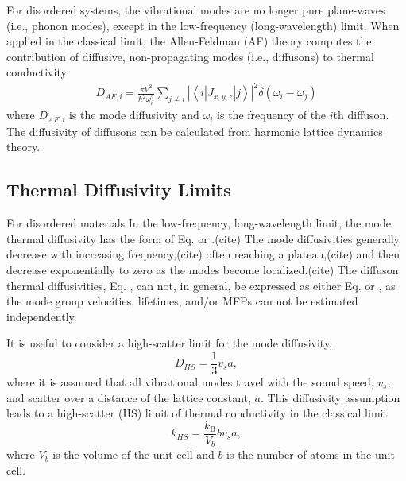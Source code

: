 \documentclass[aps,prb,twocolumn,superscriptaddress,footinbib,amsmath,amssymb,floatfix]{revtex4}
\begin{document}
For disordered systems, the vibrational modes are no 
longer pure plane-waves (i.e., phonon modes), except in the low-frequency 
(long-wavelength) limit. When applied in the classical limit, 
the Allen-Feldman (AF) theory computes 
the contribution of diffusive, non-propagating modes (i.e., diffusons) 
to thermal conductivity\cite{allen_thermal_1993} 
\begin{equation}\label{EQ:DAF}
\begin{split}
D_{AF,i} = \frac{\pi V^2}{\hbar^2\omega^2_i}\sum_{j\neq i}
|\left< i | J_{x,y,z} | j \right>|^2 \delta(\omega_i - \omega_j)
\end{split}
\end{equation}
where $D_{AF,i}$ is the mode diffusivity and $\omega_i$ is the 
frequency of the $i$th diffuson. The diffusivity of diffusons 
can be calculated from harmonic lattice dynamics theory.
\cite{allen_thermal_1993,feldman_thermal_1993,feldman_numerical_1999} 

\subsection{\label{S:Limits}Thermal Diffusivity Limits}

For disordered materials In the low-frequency, long-wavelength limit, 
the mode thermal diffusivity 
has the form of Eq. or .(cite)  The mode diffusivities 
generally decrease with increasing frequency,(cite) often reaching a 
plateau,(cite) and then decrease exponentially to zero as the modes become 
localized.(cite) The diffuson thermal diffusivities, Eq. , can not, 
in general, be 
expressed as either Eq. or , as the mode group velocities, 
lifetimes, and/or MFPs can not be estimated independently.
\cite{allen_thermal_1993,feldman_thermal_1993,
feldman_numerical_1999,allen_evolution_1998}

It is useful to consider a high-scatter limit for the mode diffusivity,
\begin{equation}\label{EQ:D_HS}
D_{HS} = \frac{1}{3} v_s a,
\end{equation}
where it is assumed that all vibrational modes travel with the sound speed, 
$v_s$, and scatter over a distance of the lattice constant, $a$. This 
diffusivity assumption leads to a high-scatter (HS) limit of thermal 
conductivity in the classical limit\cite{cahill_lattice_1988} 
\begin{equation}\label{EQ:k_HS}
k_{HS} = \frac{k_{\text{B}}}{V_b}b v_s a,
\end{equation}
where $V_b$ is the volume of the unit cell and $b$ is the number of atoms 
in the unit cell. 
\end{document}
